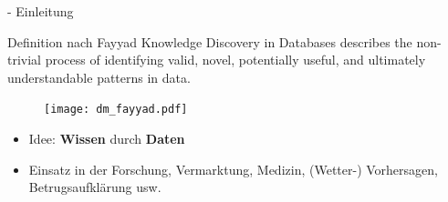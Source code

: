 \documentclass[fleqn,11pt,aspectratio=43]{beamer}
\begin{document}
\begin{frame}{\insertsectionhead - Einleitung \cite{ester2000knowledge}}
\small

\vspace{-0.8em}
\begin{block}{Definition nach Fayyad \cite{fayyad1996data}}
Knowledge Discovery in Databases describes the non-trivial process of 
identifying valid, novel, potentially useful, and ultimately understandable 
patterns in data.
\begin{figure}
\vspace{-2.7em} \hspace{-1.5em}
\texttt{[image: dm\_fayyad.pdf]}
\label{fig:fayyad1996data}
\end{figure}
\vspace{-3.5em}
\end{block}
\vspace{-1em}
\begin{itemize} %
\setlength{\itemsep}{-3pt}
\item Idee: \textbf{Wissen} durch \textbf{Daten}
\item Einsatz in der Forschung, Vermarktung, Medizin, (Wetter-) Vorhersagen, 
Betrugsaufklärung usw.
\end{itemize}
\end{frame}

%

%
\end{document}
